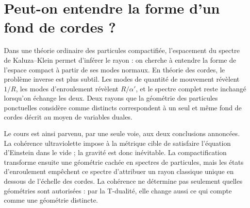 \begin{classroomqa}
\end{classroomqa}

\section{Peut-on entendre la forme d’un fond de cordes ?}

Dans une théorie ordinaire des particules compactifiée, l’espacement du spectre de Kaluza--Klein permet d’inférer le rayon : on cherche à entendre la forme de l’espace compact à partir de ses modes normaux. En théorie des cordes, le problème inverse est plus subtil. Les modes de quantité de mouvement révèlent \(1/R\), les modes d’enroulement révèlent
\(R/\alpha'\), et le spectre complet reste inchangé lorsqu’on échange les deux. Deux rayons que la géométrie des particules ponctuelles considère comme distincts correspondent à un seul et même fond de cordes décrit au moyen de variables duales.

Le cours est ainsi parvenu, par une seule voie, aux deux conclusions annoncées. La cohérence ultraviolette impose à la métrique cible de satisfaire l’équation d’Einstein dans le vide ; la gravité est donc inévitable. La compactification transforme ensuite une géométrie cachée en spectres de particules, mais les états d’enroulement empêchent ce spectre d’attribuer un rayon classique unique en dessous de l’échelle des cordes. La cohérence ne détermine pas seulement quelles géométries sont autorisées : par la T-dualité, elle change aussi ce qui compte comme une géométrie distincte.